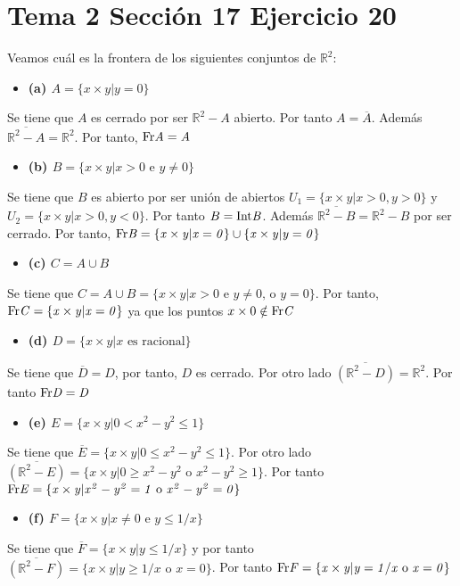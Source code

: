 \documentclass{article}
\begin{document}
\section{Tema 2 Sección 17 Ejercicio 20}
Veamos cuál es la frontera de los siguientes conjuntos de $\mathbb{R}^2$:
\begin{itemize}
\item \bf (a) \rm $A=\{x\times y|y=0\}$

\end{itemize}
Se tiene que $A$ es cerrado por ser $\mathbb{R}^2-A$ abierto. Por tanto $A=\overline{A}$. Además $\overline{\mathbb{R}^2-A}=\mathbb{R}^2$. Por tanto, $\rm Fr \it A= A$
\begin{itemize}
\item \bf (b) \rm $B=\{x\times y|x>0 \text{ e }y\neq 0\}$
\end{itemize}
Se tiene que $B$ es abierto por ser unión de abiertos $U_1=\{x\times y| x>0, y>0\}$ y $U_2=\{x\times y| x>0, y<0\}$. Por tanto $B=\rm Int\it B$. Además $\overline{\mathbb{R}^2-B}=\mathbb{R}^2-B$ por ser cerrado. Por tanto, $\rm Fr \it B= \{x\times y | x = 0\}\cup \{x\times y | y = 0\}$
\begin{itemize}
\item \bf (c) \rm $C=A\cup B$
\end{itemize} 
Se tiene que $C=A\cup B=\{x\times y | x> 0 \text{ e } y\neq 0 \text{, o } y=0\}$. Por tanto, $\rm Fr \it C=\{x\times y| x=0\}$ ya que los puntos $x\times 0\notin \rm Fr \it C$
\begin{itemize}
\item \bf (d) \rm $D=\{x\times y|x\text{ es racional}\}$ 
\end{itemize}
Se tiene que $\overline{D}=D$, por tanto, $D$ es cerrado. Por otro lado $\overline{(\mathbb{R}^2-D)}=\mathbb{R}^2$. Por tanto $\rm Fr\it D=D$
\begin{itemize}
\item \bf (e) \rm $E=\{x\times y|0<x^2-y^2\leq 1\}$ 
\end{itemize}
Se tiene que $\overline{E}=\{x\times y|0\leq x^2-y^2\leq 1\}$. Por otro lado $\overline{(\mathbb{R}^2-E)}=\{x\times y|0\geq x^2-y^2\text{ o }x^2-y^2\geq 1\}$. Por tanto $\rm Fr\it E=\{x\times y|x^2-y^2=1\text{ o }x^2-y^2=0 \}$
\begin{itemize}
\item \bf (f) \rm $F=\{x\times y|x\neq 0\text{ e } y\leq 1/x\}$ 
\end{itemize}
Se tiene que $\overline{F}=\{x\times y|y\leq 1/x\}$ y por tanto $\overline{(\mathbb{R}^2-F)}=\{x\times y|y\geq 1/x\text{ o }x=0\}$. Por tanto $\rm Fr\it F=\{x\times y|y= 1/x\text{ o }x=0\}$
\end{document}
